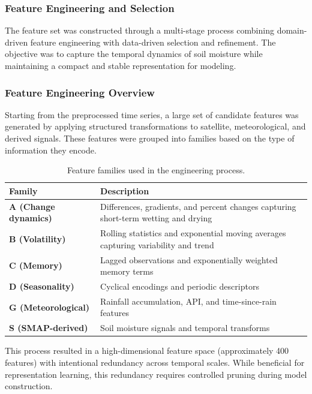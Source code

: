 \subsubsection*{Feature Engineering and Selection}

The feature set was constructed through a multi-stage process combining domain-driven feature engineering with data-driven selection and refinement. The objective was to capture the temporal dynamics of soil moisture while maintaining a compact and stable representation for modeling.

\subsubsection*{Feature Engineering Overview}

Starting from the preprocessed time series, a large set of candidate features was generated by applying structured transformations to satellite, meteorological, and derived signals. These features were grouped into families based on the type of information they encode.

\begin{table}[H]
\centering
\begin{tabularx}{\textwidth}{lX}
\toprule
\textbf{Family} & \textbf{Description} \\
\midrule
\textbf{A (Change dynamics)} & Differences, gradients, and percent changes capturing short-term wetting and drying \\
\textbf{B (Volatility)} & Rolling statistics and exponential moving averages capturing variability and trend \\
\textbf{C (Memory)} & Lagged observations and exponentially weighted memory terms \\
\textbf{D (Seasonality)} & Cyclical encodings and periodic descriptors \\
\textbf{G (Meteorological)} & Rainfall accumulation, API, and time-since-rain features \\
\textbf{S (SMAP-derived)} & Soil moisture signals and temporal transforms \\
\bottomrule
\end{tabularx}
\caption{Feature families used in the engineering process.}
\end{table}

This process resulted in a high-dimensional feature space (approximately 400 features) with intentional redundancy across temporal scales. While beneficial for representation learning, this redundancy requires controlled pruning during model construction.

